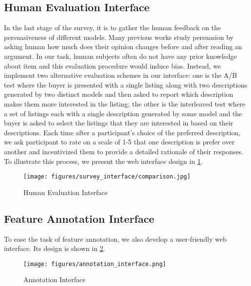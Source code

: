 \subsection{Human Evaluation Interface}
\label{app: comparison-interface}
In the last stage of the survey, it is to gather the human feedback on the persuasiveness of different models. 
Many previous works study persuasion by asking human how much does their opinion changes before and after reading an argument. In our task, human subjects often do not have any prior knowledge about item and this evaluation procedure would induce bias.
Instead, we implement two alternative evaluation schemes in our interface: one is the A/B test where the buyer is presented with a single listing along with two descriptions generated by two distinct models and then asked to report which description makes them more interested in the listing; the other is the interleaved test where a set of listings each with a single description generated by some model and the buyer is asked to select the listings that they are interested in based on their descriptions. Each time after a participant's choice of the preferred description, we ask participant to rate on a scale of 1-5 that one description is prefer over another and incentivized them to provide a detailed rationale of their responses. To illustrate this process, we present the web interface design in \cref{fig:comparison_interface}. 

\begin{figure}[h!]
    \centering
    \texttt{[image: figures/survey\_interface/comparison.jpg]}
    \caption{Human Evaluation Interface}
    \label{fig:comparison_interface}
\end{figure}

\subsection{Feature Annotation Interface}
\label{app: feature_highlight_annotation_interface}
To ease the task of feature annotation, we also develop a user-friendly web interface. Its design is shown in  \cref{fig:feature_highlight_annotation_interface}.

\begin{figure}[h!]
    \centering
    \texttt{[image: figures/annotation\_interface.png]}
    \caption{Annotation Interface}
    \label{fig:feature_highlight_annotation_interface}
\end{figure}

